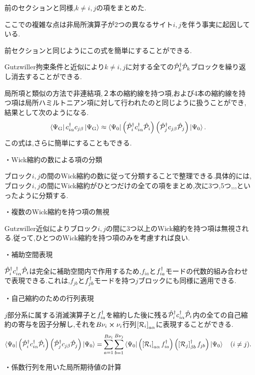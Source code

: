 前のセクションと同様,$k \ne i,j$の項をまとめた.

ここでの複雑な点は非局所演算子が2つの異なるサイト$i,j$を伴う事実に起因している.

前セクションと同じようにこの式を簡単にすることができる.

Gutzwiller拘束条件と近似により$k \ne i,j$に対する全ての$\hat{\mathcal{P}}^\dagger_{k}\hat{\mathcal{P}}_{k}$ブロックを繰り返し消去することができる.

局所項と類似の方法で非連結項,２本の縮約線を持つ項,および4本の縮約線を持つ項は局所ハミルトニアン項に対して行われたのと同じように扱うことができ,結果として次のようになる.
\begin{equation}
    \Bra{\Psi_{\text{G}}}c^\dagger_{i\alpha}c_{j\beta}\Ket{\Psi_{\text{G}}}\approx \Bra{\Psi_{0}}\left( \hat{\mathcal{P}}^\dagger_{i}c^\dagger_{i\alpha}\hat{\mathcal{P}}_{i} \right)\left( \hat{\mathcal{P}}^\dagger_{j}c_{j\beta}\hat{\mathcal{P}}_{j} \right)\Ket{\Psi_{0}}.
\end{equation}
この式は,さらに簡単にすることもできる.

・Wick縮約の数による項の分類

ブロック$i,j$の間のWick縮約の数に従って分類することで整理できる.具体的には,ブロック$i,j$の間にWick縮約がひとつだけの全ての項をまとめ,次に3つ,5つ,,,といったように分類する.

・複数のWick縮約を持つ項の無視

Gutzwiller近似によりブロック$i,j$の間に3つ以上のWick縮約を持つ項は無視される.従って,ひとつのWick縮約を持つ項のみを考慮すれば良い.

・補助空間表現

$\hat{\mathcal{P}}^\dagger_{i}c^\dagger_{i\alpha}\hat{\mathcal{P}}_{i}$は完全に補助空間内で作用するため,$f_{ia}$と$f^\dagger_{ia}$モードの代数的組み合わせで表現できる.これは,$f_{jb}$と$f^\dagger_{jb}$モードを持つ$j$ブロックにも同様に適用できる.

・自己縮約のための行列表現

$j$部分系に属する消滅演算子と$f^\dagger_{ia}$を縮約した後に残る$\hat{\mathcal{P}}^\dagger_{i}c^\dagger_{i\alpha}\hat{\mathcal{P}}_{i}$内の全ての自己縮約の寄与を因子分解し,それを$B\nu_{i}\cross \nu_{i}$行列$\left[ \mathcal{R}_{i} \right]_{a\alpha}$に表現することができる.
\begin{equation}
    \Bra{\Psi_{0}}\left( \hat{\mathcal{P}}^\dagger_{i}c^\dagger_{i\alpha}\hat{\mathcal{P}}_{i} \right)\left( \hat{\mathcal{P}}^\dagger_{j}c_{j\beta}\hat{\mathcal{P}}_{j} \right)\Ket{\Psi_{0}}=\sum_{a=1}^{B\nu_{i}}\sum_{b=1}^{B\nu_{j}}\Bra{\Psi_{0}}\left( \left[ \mathcal{R}_{i} \right]_{a\alpha}f^\dagger_{ia} \right)\left( \left[ \mathcal{R}_{j} \right]^\dagger_{\beta b}f_{jb} \right)\Ket{\Psi_{0}} \quad (i\ne j).
\end{equation}

・係数行列を用いた局所期待値の計算

